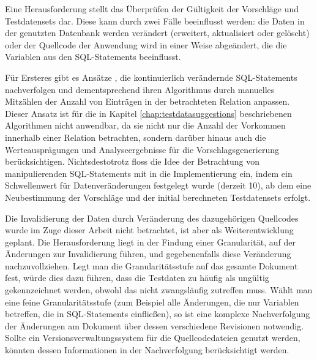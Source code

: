 Eine Herausforderung stellt das Überprüfen der Gültigkeit der Vorschläge und Testdatensets dar.
Diese kann durch zwei Fälle beeinflusst werden: die Daten in der genutzten Datenbank werden verändert (erweitert, aktualisiert oder gelöscht) oder der Quellcode der Anwendung wird in einer Weise abgeändert, die die Variablen aus den SQL-Statements beeinflusst.

Für Ersteres gibt es Ansätze \cite{DBLP:conf/dasfaa/HarangsriSN97}, die kontinuierlich verändernde SQL-Statements nachverfolgen und dementsprechend ihren Algorithmus durch manuelles Mitzählen der Anzahl von Einträgen in der betrachteten Relation anpassen.
Dieser Ansatz ist für die in Kapitel \ref{chap:testdatasuggestions} beschriebenen Algorithmen nicht anwendbar, da sie nicht nur die Anzahl der Vorkommen innerhalb einer Relation betrachten, sondern darüber hinaus auch die Werteausprägungen und Analyseergebnisse für die Vorschlagsgenerierung berücksichtigen.
Nichtsdestotrotz floss die Idee der Betrachtung von manipulierenden SQL-Statements mit in die Implementierung ein, indem ein Schwellenwert für Datenveränderungen festgelegt wurde (derzeit 10), ab dem eine Neubestimmung der Vorschläge und der initial berechneten Testdatensets erfolgt.

Die Invalidierung der Daten durch Veränderung des dazugehörigen Quellcodes wurde im Zuge dieser Arbeit nicht betrachtet, ist aber als Weiterentwicklung geplant.
Die Herausforderung liegt in der Findung einer Granularität, auf der Änderungen zur Invalidierung führen, und gegebenenfalls diese Veränderung nachzuvollziehen.
Legt man die Granularitätsstufe auf das gesamte Dokument fest, würde dies dazu führen, dass die Testdaten zu häufig als ungültig gekennzeichnet werden, obwohl das nicht zwangsläufig zutreffen muss.
Wählt man eine feine Granularitätsstufe (zum Beispiel alle Änderungen, die nur Variablen betreffen, die in SQL-Statements einfließen), so ist eine komplexe Nachverfolgung der Änderungen am Dokument über dessen verschiedene Revisionen notwendig.
Sollte ein Versionsverwaltungssystem für die Quellcodedateien genutzt werden, könnten dessen Informationen in der Nachverfolgung berücksichtigt werden.


